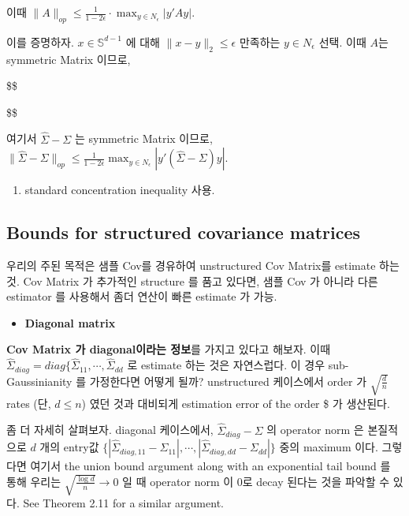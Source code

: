 \documentclass[
]{book}
\providecommand{\tightlist}{%
  \setlength{\itemsep}{0pt}\setlength{\parskip}{0pt}}
\begin{document}
{{{이때 \(\| A \|_{op} \le \frac{1}{1-2\epsilon} \cdot \max_{y \in N_\epsilon} | y' A y |\).

이를 증명하자. \(x \in \mathbb S^{d-1}\) 에 대해 \(\| x-y \|_2 \le \epsilon\) 만족하는 \(y \in N_\epsilon\) 선택. 이때 \(A\)는 symmetric Matrix 이므로,

\$\$

\$\$

여기서 \(\hat \Sigma - \Sigma\) 는 symmetric Matrix 이므로, \(\|\hat \Sigma - \Sigma \|_{op} \le \frac{1}{1-2\epsilon} \max_{y \in N_\epsilon} | y' (\hat \Sigma - \Sigma) y |\).

\begin{enumerate}
\def\labelenumi{\arabic{enumi}.}
\setcounter{enumi}{1}
\tightlist
\item
  standard concentration inequality 사용.
\end{enumerate}

\hypertarget{bounds-for-structured-covariance-matrices}{%
\subsection{Bounds for structured covariance matrices}\label{bounds-for-structured-covariance-matrices}}

우리의 주된 목적은 샘플 Cov를 경유하여 unstructured Cov Matrix를 estimate 하는 것. Cov Matrix 가 추가적인 structure 를 품고 있다면, 샘플 Cov 가 아니라 다른 estimator 를 사용해서 좀더 연산이 빠른 estimate 가 가능.

\begin{itemize}
\tightlist
\item
  \textbf{Diagonal matrix}
\end{itemize}

\textbf{Cov Matrix 가 diagonal이라는 정보}를 가지고 있다고 해보자. 이때 \(\hat \Sigma_{diag} = diag \{ \hat \Sigma_{11}, \cdots, \hat \Sigma_{dd}\) 로 estimate 하는 것은 자연스럽다. 이 경우 sub-Gaussinianity 를 가정한다면 어떻게 될까? unstructured 케이스에서 order 가 \(\sqrt{\frac{d}{n}}\) rates (단, \(d \le n\)) 였던 것과 대비되게 estimation error of the order \$ 가 생산된다.

좀 더 자세히 살펴보자. diagonal 케이스에서, \(\hat \Sigma_{diag} - \Sigma\) 의 operator norm 은 본질적으로 \(d\) 개의 entry값 \(\{| \hat \Sigma_{diag,11} - \Sigma_{11} |, \cdots, | \hat \Sigma_{diag,dd} - \Sigma_{dd} |\}\) 중의 maximum 이다. 그렇다면 여기서 the union bound argument along with an exponential tail bound 를 통해 우리는 \(\sqrt{\frac{\log d}{n}} → 0\) 일 때 operator norm 이 0로 decay 된다는 것을 파악할 수 있다. See Theorem 2.11 for a similar argument.

}}}
\end{document}
